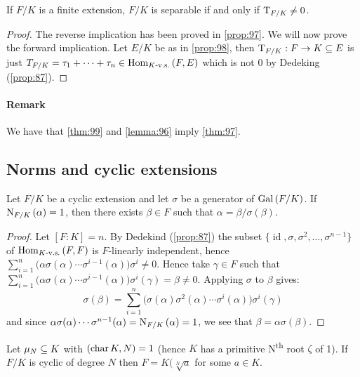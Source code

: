 \begin{theorem}
  \label{thm:99}
  If $F/K$ is a finite extension, $F/K$ is separable if and only if $\traceop_{F/K} \neq 0$.
\end{theorem}

\begin{proof}
  The reverse implication has been proved in \autoref{prop:97}. We will now prove the forward implication. Let $E/K$ be as in \autoref{prop:98}, then $\traceop_{F/K} : F \rightarrow K \subseteq E$ is just $T_{F/K} = \tau_1 + \dotsb + \tau_n \in \homset[K\text{-v.s.}]{F}{E}$ which is not 0 by Dedeking (\autoref{prop:87}).
\end{proof}

\paragraph{Remark}

We have that \autoref{thm:99} and \autoref{lemma:96} imply \autoref{thm:97}.

\subsection{Norms and cyclic extensions}

\begin{theorem}
\label{thm:100}
  Let $F/K$ be a cyclic extension and let $\sigma$ be a generator of $\Gal{F/K}$. If $\norm{F/K}{\alpha} = 1$, then there exists $\beta \in F$ such that $\alpha = \beta / \sigma(\beta)$.
\end{theorem}

\begin{proof}
  Let $[F : K] = n$. By Dedekind (\autoref{prop:87}) the subset $\{ \operatorname{id}, \sigma, \sigma^2, \dotsc, \sigma^{n-1} \}$ of $\homset[K\text{-v.s.}]{F}{F}$ is $F$-linearly independent, hence $\sum_{i=1}^n \big(\alpha\sigma(\alpha)\dotsm\sigma^{i-1}(\alpha)\big)\sigma^i \neq 0$. Hence take $\gamma \in F$ such that $\sum_{i=1}^n \big(\alpha\sigma(\alpha)\dotsm\sigma^{i-1}(\alpha)\big)\sigma^i(\gamma) = \beta \neq 0$. Applying $\sigma$ to $\beta$ gives:
\[
\sigma(\beta) = \sum_{i=1}^n \big(\sigma(\alpha)\sigma^2(\alpha)\dotsm\sigma^i(\alpha)\big)\sigma^i(\gamma)
\]
and since $\alpha\sigma(\alpha)\dotsm\sigma^{n-1}(\alpha) = \norm{F/K}{\alpha} = 1$, we see that $\beta = \alpha\sigma(\beta)$.
\end{proof}

\begin{corollary}
  \label{cor:101}
  Let $\unityroots{N} \subseteq K$ with $(\mchar K , N) = 1$ (hence $K$ has a primitive N\textsuperscript{th} root $\zeta$ of 1). If $F/K$ is cyclic of degree $N$ then $F = K(\sqrt[N]{a}$ for some $a \in K$.
\end{corollary}

